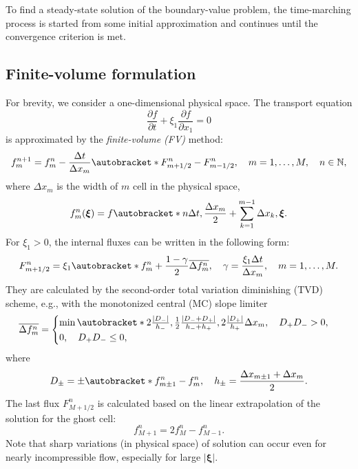 \documentclass{article}
\newcommand{\pder}[2][]{\frac{\partial#1}{\partial#2}}
\DeclarePairedDelimiter\autobracket()       %
\newcommand{\br}[1]{\autobracket*{#1}}
\newcommand{\bxi}{{\boldsymbol{\xi}}}
\begin{document}
To find a steady-state solution of the boundary-value problem,
the time-marching process is started from some initial approximation
and continues until the convergence criterion is met.

\subsection{Finite-volume formulation}\label{sec:fv}

For brevity, we consider a one-dimensional physical space.
The transport equation
\begin{equation}\label{eq:transport}
    \pder[f]{t} + \xi_1\pder[f]{x_1} = 0
\end{equation}
is approximated by the \emph{finite-volume (FV)} method:
\begin{equation}\label{eq:finite_volume}
    f^{n+1}_m = f^n_m - \frac{\Delta{t}}{\Delta{x_m}}\br{F^n_{m+1/2}-F^n_{m-1/2}}, \quad
    m = 1,\dots,M, \quad n\in\mathbb{N},
\end{equation}
where \(\Delta{x_m}\) is the width of \(m\) cell in the physical space,
\begin{equation}\label{eq:vdf_fv}
    f^n_m(\bxi) = f\br{n\Delta{t}, \frac{\Delta{x_m}}2 + \sum_{k=1}^{m-1}\Delta{x_k}, \bxi}.
\end{equation}
For \(\xi_1>0\), the internal fluxes can be written in the following form:
\begin{equation}\label{eq:internal_fluxes}
    F_{m+1/2}^n = \xi_1\br{ f_m^n + \frac{1-\gamma}2\overline{\Delta{f_m^n}}},
    \quad \gamma = \frac{\xi_1\Delta{t}}{\Delta{x_m}}, \quad m = 1,\dots,M.
\end{equation}
They are calculated by the second-order total variation diminishing (TVD) scheme,
e.g., with the monotonized central (MC) slope limiter
\begin{equation}\label{eq:limiter}
    \overline{\Delta{f_m^n}} = \begin{cases}\min\br{
         2\frac{|D_-|}{h_-}, \frac12\frac{|D_-+D_+|}{h_-+h_+}, 2\frac{|D_+|}{h_+}
    }\Delta{x_m}, \quad D_+D_- > 0, \\
    0, \quad D_+D_- \leq 0,
    \end{cases}
\end{equation}
where
\begin{equation}\label{eq:differences}
    D_\pm = \pm\br{f_{m\pm1}^n - f_m^n}, \quad h_\pm = \frac{\Delta{x_{m\pm1}} + \Delta{x_m}}2.
\end{equation}
The last flux \(F_{M+1/2}^n\) is calculated based on the linear extrapolation of the solution for the ghost cell:
\begin{equation}\label{eq:last_ghost}
    f_{M+1}^n = 2f_M^n - f_{M-1}^n.
\end{equation}
Note that sharp variations (in physical space) of solution can occur even for nearly incompressible flow,
especially for large \(|\bxi|\).
\end{document}
